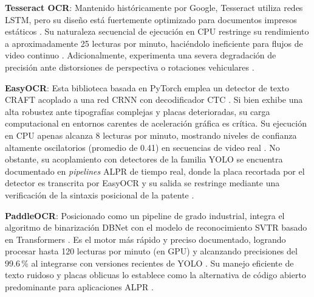 \textbf{Tesseract OCR}: 
Mantenido históricamente por Google, Tesseract utiliza redes LSTM, pero su diseño está 
fuertemente optimizado para documentos impresos estáticos 
\parencite{athilakshmiAutomaticNumberPlate2023, meesadAdvancedDeepLearning2025a, swatiEfficientDeepLearning2024}. 
Su naturaleza secuencial de ejecución en CPU restringe su rendimiento a aproximadamente 
25 lecturas por minuto, haciéndolo ineficiente para flujos de video continuo 
\parencite{xuDeepLearningAlgorithms2026c}. 
Adicionalmente, experimenta una severa degradación de precisión ante distorsiones de 
perspectiva o rotaciones vehiculares \parencite{swatiEfficientDeepLearning2024, xuDeepLearningAlgorithms2026c}.

\textbf{EasyOCR}: 
Esta biblioteca basada en PyTorch emplea un detector de texto CRAFT acoplado a una red 
CRNN con decodificador CTC \parencite{kuyunsaDeepLearningEnhancedAutomatic2025, mobeenRealTimeAutomaticLicense2026, xuDeepLearningAlgorithms2026c}. 
Si bien exhibe una alta robustez ante tipografías complejas y placas deterioradas, su 
carga computacional en entornos carentes de aceleración gráfica es crítica. Su ejecución en CPU 
apenas alcanza 8 lecturas por minuto, mostrando niveles de confianza altamente oscilatorios 
(promedio de 0.41) en secuencias de video real
\parencite{mobeenRealTimeAutomaticLicense2026, xuDeepLearningAlgorithms2026c}.
No obstante, su acoplamiento con detectores de la familia YOLO se encuentra documentado en
\textit{pipelines} ALPR de tiempo real, donde la placa recortada por el detector es
transcrita por EasyOCR y su salida se restringe mediante una verificación de la sintaxis
posicional de la patente \parencite{mobeenRealTimeAutomaticLicense2026}.

\textbf{PaddleOCR}: 
Posicionado como un pipeline de grado industrial, integra el algoritmo de binarización 
DBNet con el modelo de reconocimiento SVTR basado en Transformers 
\parencite{buleuDeepLearningBasedSystem2025a, xuDeepLearningAlgorithms2026c}. 
Es el motor más rápido y preciso documentado, logrando procesar hasta 120 lecturas por 
minuto (en GPU) y alcanzando precisiones del 99.6\,\% al integrarse con versiones recientes 
de YOLO \parencite{buleuDeepLearningBasedSystem2025a, xuDeepLearningAlgorithms2026c}. 
Su manejo eficiente de texto ruidoso y placas oblicuas lo establece como la alternativa 
de código abierto predominante para aplicaciones ALPR \parencite{xuDeepLearningAlgorithms2026c}.

